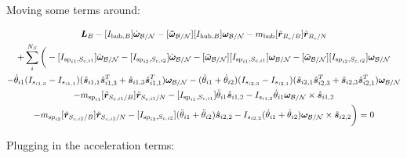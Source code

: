 \documentclass[paper]{aiaaNew}
\begin{document}
Moving some terms around:

\begin{multline}
\bm L_B -[I_{\text{hub},B}] \dot{\bm\omega}_{\cal B/N}  -[\bm{\tilde{\omega}}_{\cal B/N}] [I_{\text{hub},B}] \bm\omega_{\cal B/N} - m_{\text{hub}} [\tilde{{\bm r}}_{B_c/B}] \ddot{\bm r}_{B_c/N} \\
+ \sum\limits_{i}^{N_S}\bigg(-[I_{\text{sp}_{i1},S_{c,i1}}] \dot{\bm \omega}_{\cal{B/N}} -[I_{\text{sp}_{i2},S_{c,i2}}] \dot{\bm \omega}_{\cal{B/N}} -[\tilde{\bm \omega}_{\cal{B/N}}] [I_{\text{sp}_{i1},S_{c,i1}}] \bm \omega_{\cal{B/N}}-[\tilde{\bm \omega}_{\cal{B/N}}] [I_{\text{sp}_{i2},S_{c,i2}}] \bm \omega_{\cal{B/N}}\\
-\dot{\theta}_{i1} (I_{s_{i1,3}} - I_{s_{i1,1}})( \hat{\bm s}_{i1,1} \hat{\bm s}_{i1,3}^T + \hat{\bm s}_{i1,3} \hat{\bm s}_{i1,1}^T) \bm \omega_{\cal{B/N}} -(\dot{\theta}_{i1}  + \dot{\theta}_{i2})(I_{s_{i2,3}} - I_{s_{i2,1}}) (\hat{\bm s}_{i2,1} \hat{\bm s}_{i2,3}^T + \hat{\bm s}_{i2,3} \hat{\bm s}_{i2,1}^T) \bm \omega_{\cal{B/N}} \\
- m_{\text{sp}_{i1}} [\tilde{{\bm r}}_{S_{c,i1}/B}] \ddot{\bm r}_{S_{c,i1}/N} -[I_{\text{sp}_{i1},S_{c,i1}}] \ddot{\theta}_{i1} \hat{\bm s}_{i1,2} 
-I_{s_{i1,2}} \dot{\theta}_{i1} \bm \omega_{\cal{B/N}} \times \hat{\bm s}_{i1,2}\\
- m_{\text{sp}_{i2}} [\tilde{{\bm r}}_{S_{c,i2}/B}] \ddot{\bm r}_{S_{c,i2}/N} -[I_{\text{sp}_{i2},S_{c,i2}}] (\ddot{\theta}_{i1}  + \ddot{\theta}_{i2})\hat{\bm s}_{i2,2} 
-I_{s_{i2,2}}  (\dot{\theta}_{i1}  + \dot{\theta}_{i2}) \bm \omega_{\cal{B/N}} \times \hat{\bm s}_{i2,2} \bigg) = 0
\end{multline}

Plugging in the acceleration terms:
\end{document}
